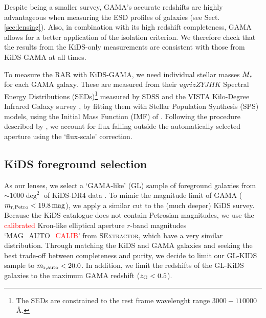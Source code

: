 \documentclass[usenatbib]{mnras}
\newcommand{\magn}{\, {\rm mag} }
\newcommand{\un}[1]{_{\rm #1}}
\begin{document}
Despite being a smaller survey, GAMA's accurate redshifts are highly advantageous when measuring the ESD profiles of galaxies (see Sect. \ref{sec:lensing}). Also, in combination with its high redshift completeness, GAMA allows for a better application of the isolation criterion. We therefore check that the results from the KiDS-only measurements are consistent with those from KiDS-GAMA at all times.

To measure the RAR with KiDS-GAMA, we need individual stellar masses $M\un{*}$ for each GAMA galaxy. These are measured from their $ugrizZYJHK$ Spectral Energy Distributions (SEDs)\footnote{The SEDs are constrained to the rest frame wavelenght range $3000-110000$ \AA.} measured by SDSS and the VISTA Kilo-Degree Infrared Galaxy survey \cite[VIKING,][]{edge2013}, by fitting them with \cite{bruzual2003} Stellar Population Synthesis (SPS) models, using the Initial Mass Function (IMF) of \cite{chabrier2003}. Following the procedure described by \cite{taylor2011}, we account for flux falling outside the automatically selected aperture using the `flux-scale' correction.

\subsection{KiDS foreground selection}
\label{sec:gamalike_kids}

As our lenses, we select a `GAMA-like' (GL) sample of foreground galaxies from $\sim1000 \deg^2$ of KiDS-DR4 data \cite[]{kuijken2019}. To mimic the magnitude limit of GAMA ($m\un{r,Petro}<19.8 \magn$), we apply a similar cut to the (much deeper) KiDS survey. Because the KiDS catalogue does not contain Petrosian magnitudes, we use the \textcolor{red}{calibrated} Kron-like elliptical aperture $r$-band magnitudes `MAG\_AUTO\textcolor{red}{\_CALIB}' from \textsc{SExtractor}, which have a very similar distribution. Through matching the KiDS and GAMA galaxies and seeking the best trade-off between completeness and purity, we decide to limit our GL-KIDS sample to $m\un{r,auto}<20.0$. In addition, we limit the redshifts of the GL-KiDS galaxies to the maximum GAMA redshift ($z\un{G}<0.5$).
\end{document}
